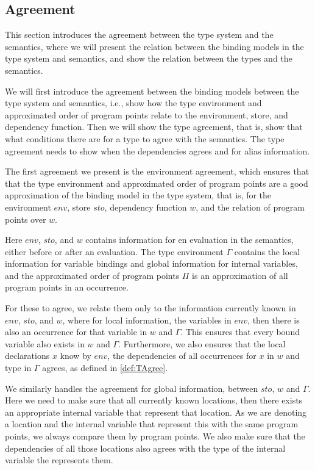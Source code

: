 \documentclass[../../master.tex]{subfiles}
\begin{document}
\subsection{Agreement}
This section introduces the agreement between the type system and the semantics, where we will present the relation between the binding models in the type system and semantics, and show the relation between the types and the semantics.

We will first introduce the agreement between the binding models between the type system and semantics, i.e., show how the type environment and approximated order of program points relate to the environment, store, and dependency function.
Then we will show the type agreement, that is, show that what conditions there are for a type to agree with the semantics.
The type agreement needs to show when the dependencies agrees and for alias information.
\bigskip

The first agreement we present is the environment agreement, which ensures that that the type environment and approximated order of program points are a good approximation of the binding model in the type system, that is, for the environment $env$, store $sto$, dependency function $w$, and the relation of program points over $w$.

Here $env$, $sto$, and $w$ contains information for en evaluation in the semantics, either before or after an evaluation.
The type environment $\Gamma$ contains the local information for variable bindings and global information for internal variables, and the approximated order of program points $\Pi$ is an approximation of all program points in an occurrence.

For these to agree, we relate them only to the information currently known in $env$, $sto$, and $w$, where for local information, the variables in $env$, then there is also an occurrence for that variable in $w$ and $\Gamma$.
This ensures that every bound variable also exists in $w$ and $\Gamma$.
Furthermore, we also ensures that the local declarations $x$ know by $env$, the dependencies of all occurrences for $x$ in $w$ and type in $\Gamma$ agrees, as defined in \cref{def:TAgree}.

We similarly handles the agreement for global information, between $sto$, $w$ and $\Gamma$.
Here we need to make sure that all currently known locations, then there exists an appropriate internal variable that represent that location.
As we are denoting a location and the internal variable that represent this with the same program points, we always compare them by program points.
We also make sure that the dependencies of all those locations also agrees with the type of the internal variable the represents them.
\end{document}
